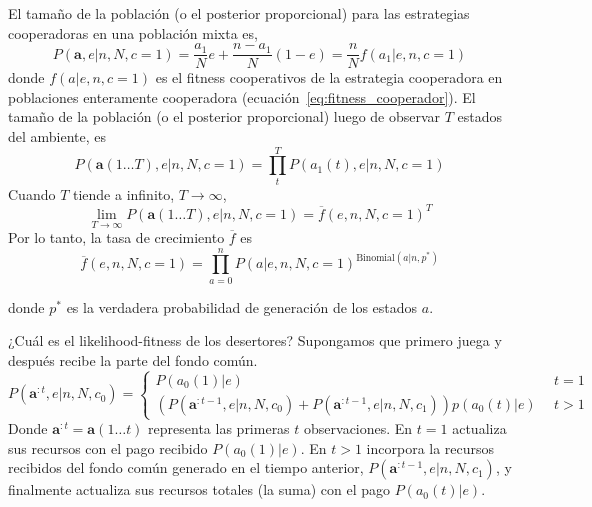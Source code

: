 \documentclass[a4paper,10pt]{article}
\begin{document}
{El tamaño de la población (o el posterior proporcional) para las estrategias cooperadoras en una población mixta es, 
%
\begin{equation}
P(\bm{a},e|n,N,c=1) = \frac{a_1}{N} e + \frac{n-a_1}{N}(1-e) = \frac{n}{N} f(a_1|e,n,c=1)
\end{equation}
donde $f(a|e,n,c=1)$ es el fitness cooperativos de la estrategia cooperadora en poblaciones enteramente cooperadora (ecuación~\ref{eq:fitness_cooperador}).
El tamaño de la población (o el posterior proporcional) luego de observar $T$ estados del ambiente, es
%
\begin{equation}
P(\bm{a}(1 \dots T),e|n,N,c=1) = \prod^T_t P(a_1(t),e|n,N,c=1)
\end{equation}
%
Cuando $T$ tiende a infinito, $T \rightarrow \infty$,
\begin{equation}
\lim_{T \rightarrow \infty}P(\bm{a}(1 \dots T),e|n,N,c=1) = \overline{f}(e,n,N,c=1)^T
\end{equation}
Por lo tanto, la tasa de crecimiento $\overline{f}$ es
\begin{equation} \label{eq:coop_temporal_average}
\overline{f}(e,n,N,c=1) = \prod_{a=0}^n P(a|e,n,N,c=1)^{\text{Binomial}(a|n,p^*)}
\end{equation}

%
donde $p^*$ es la verdadera probabilidad de generación de los estados $a$.
% 


¿Cuál es el likelihood-fitness de los desertores?
Supongamos que primero juega y después recibe la parte del fondo común.
\begin{equation}
P(\bm{a}^{:t},e|n,N, c_0) =
\begin{cases}
 P(a_0(1)|e) & \ \  t=1 \\
 (P(\bm{a}^{:t-1},e|n,N,c_0) + P(\bm{a}^{:t-1}, e|n,N,c_1)) p(a_0(t)|e) & \ \  t>1
\end{cases}
\end{equation}
Donde $\bm{a}^{:t} = \bm{a}(1 \dots t)$ representa las primeras $t$ observaciones.
En $t=1$ actualiza sus recursos con el pago recibido $P(a_0(1)|e)$.
En $t>1$ incorpora la recursos recibidos del fondo común generado en el tiempo anterior, $ P(\bm{a}^{:t-1}, e|n,N,c_1)$, y finalmente actualiza sus recursos totales (la suma) con el pago $P(a_0(t)|e)$.

}
\end{document}
